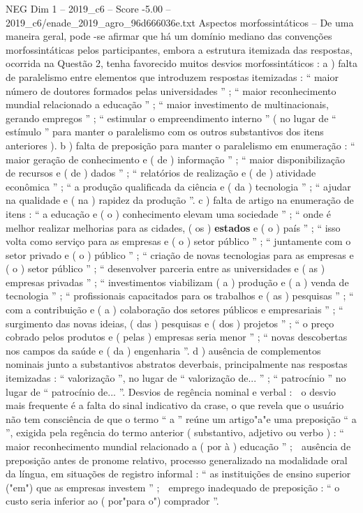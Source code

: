 \begin{textsample}{NEG Dim 1 – 2019\_c6 – Score -5.00 – 2019\_c6/enade\_2019\_agro\_96d666036e.txt}
Aspectos morfossintáticos – De uma maneira geral, pode -se afirmar que há um domínio mediano das convenções morfossintáticas pelos participantes, embora a estrutura itemizada das respostas, ocorrida na Questão 2, tenha favorecido muitos desvios morfossintáticos : a ) falta de paralelismo entre elementos que introduzem respostas itemizadas : “ maior número de doutores formados pelas universidades ” ; “ maior reconhecimento mundial relacionado a educação ” ; “ maior investimento de multinacionais, gerando empregos ” ; “ estimular o empreendimento interno ” ( no lugar de “ estímulo ” para manter o paralelismo com os outros substantivos dos itens anteriores ). b ) falta de preposição para manter o paralelismo em enumeração : “ maior geração de conhecimento e ( de ) informação ” ; “ maior disponibilização de recursos e ( de ) dados ” ; “ relatórios de realização e ( de ) atividade econômica ” ; “ a produção qualificada da ciência e ( da ) tecnologia ” ; “ ajudar na qualidade e ( na ) rapidez da produção ”. c ) falta de artigo na enumeração de itens : “ a educação e ( o ) conhecimento elevam uma sociedade ” ; “ onde é melhor realizar melhorias para as cidades, ( os ) \textbf{estados} e ( o ) país ” ; “ isso volta como serviço para as empresas e ( o ) setor público ” ; “ juntamente com o setor privado e ( o ) público ” ; “ criação de novas tecnologias para as empresas e ( o ) setor público ” ; “ desenvolver parceria entre as universidades e ( as ) empresas privadas ” ; “ investimentos viabilizam ( a ) produção e ( a ) venda de tecnologia ” ; “ profissionais capacitados para os trabalhos e ( as ) pesquisas ” ; “ com a contribuição e ( a ) colaboração dos setores públicos e empresariais ” ; “ surgimento das novas ideias, ( das ) pesquisas e ( dos ) projetos ” ; “ o preço cobrado pelos produtos e ( pelas ) empresas seria menor ” ; “ novas descobertas nos campos da saúde e ( da ) engenharia ”. d ) ausência de complementos nominais junto a substantivos abstratos deverbais, principalmente nas respostas itemizadas : “ valorização ”, no lugar de “ valorização de... ” ; “ patrocínio ” no lugar de “ patrocínio de... ”.
Desvios de regência nominal e verbal :  o desvio mais frequente é a falta do sinal indicativo da crase, o que revela que o usuário não tem consciência de que o termo “ a ” reúne um artigo"a"e uma preposição “ a ”, exigida pela regência do termo anterior ( substantivo, adjetivo ou verbo ) : “ maior reconhecimento mundial relacionado a ( por à ) educação ” ;  ausência de preposição antes de pronome relativo, processo generalizado na modalidade oral da língua, em situações de registro informal : “ as instituições de ensino superior ("em") que as empresas investem ” ;  emprego inadequado de preposição : “ o custo seria inferior ao ( por"para o") comprador ”.

\end{textsample}
